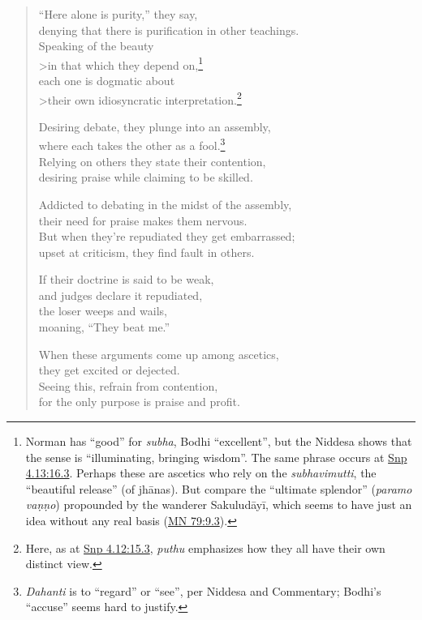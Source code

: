 \documentclass[12pt,openany]{book}%
\begin{document}
\begin{verse}%
“Here alone is purity,” they say, \\
denying that there is purification in other teachings. \\
Speaking of the beauty \\>in that which they depend on,\footnote{Norman has “good” for \textit{subha}, Bodhi “excellent”, but the Niddesa shows that the sense is “illuminating, bringing wisdom”. The same phrase occurs at \href{https://suttacentral.net/snp4.13/en/sujato\#16.3}{Snp 4.13:16.3}. Perhaps these are ascetics who rely on the \textit{subhavimutti}, the “beautiful release” (of \textsanskrit{jhānas}). But compare the “ultimate splendor” (\textit{paramo \textsanskrit{vaṇṇo}}) propounded by the wanderer \textsanskrit{Sakuludāyī}, which seems to have just an idea without any real basis (\href{https://suttacentral.net/mn79/en/sujato\#9.3}{MN 79:9.3}). } \\
each one is dogmatic about \\>their own idiosyncratic interpretation.\footnote{Here, as at \href{https://suttacentral.net/snp4.12/en/sujato\#15.3}{Snp 4.12:15.3}, \textit{puthu} emphasizes how they all have their own distinct view. } 

Desiring debate, they plunge into an assembly, \\
where each takes the other as a fool.\footnote{\textit{Dahanti} is to “regard” or “see”, per Niddesa and Commentary; Bodhi’s “accuse” seems hard to justify. } \\
Relying on others they state their contention, \\
desiring praise while claiming to be skilled. 

Addicted to debating in the midst of the assembly, \\
their need for praise makes them nervous. \\
But when they’re repudiated they get embarrassed; \\
upset at criticism, they find fault in others. 

If their doctrine is said to be weak, \\
and judges declare it repudiated, \\
the loser weeps and wails, \\
moaning, “They beat me.” 

When these arguments come up among ascetics, \\
they get excited or dejected. \\
Seeing this, refrain from contention, \\
for the only purpose is praise and profit. 


\end{verse}
\end{document}

